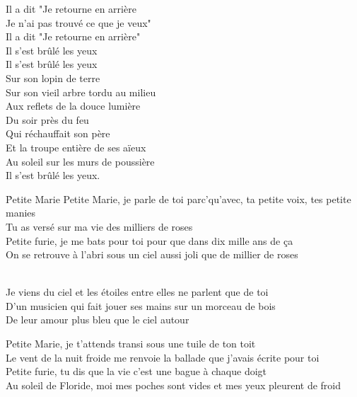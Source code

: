\documentclass{novel}
\begin{document}
\begin{multicols}{2}
Il a dit "Je retourne en arrière \\
Je n'ai pas trouvé ce que je veux" \\
Il a dit "Je retourne en arrière" \\
Il s'est brûlé les yeux \\
Il s’est brûlé les yeux \\
Sur son lopin de terre \\
Sur son vieil arbre tordu au milieu \\
Aux reflets de la douce lumière \\
Du soir près du feu \\
Qui réchauffait son père \\
Et la troupe entière de ses aïeux \\
Au soleil sur les murs de poussière \\
Il s’est brûlé les yeux. \\
\end{multicols}

\newpage
\large

\h*{Petite Marie}
Petite Marie, je parle de toi parc'qu'avec, ta petite voix, tes petite manies \\
Tu as versé sur ma vie des milliers de roses \\

Petite furie, je me bats pour toi pour que dans dix mille ans de ça \\
On se retrouve à l'abri sous un ciel aussi joli que de millier de roses \\

\begin{bfseries}
[Refrain:]\\
Je viens du ciel et les étoiles entre elles ne parlent que de toi \\
D'un musicien qui fait jouer ses mains sur un morceau de bois \\
De leur amour plus bleu que le ciel autour \\
\end{bfseries}

Petite Marie, je t'attends transi sous une tuile de ton toit \\
Le vent de la nuit froide me renvoie la ballade que j'avais écrite pour toi \\
Petite furie, tu dis que la vie c'est une bague à chaque doigt \\
Au soleil de Floride, moi mes poches sont vides et mes yeux pleurent de froid \\
\end{document}
